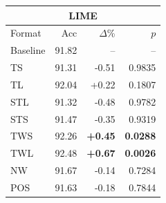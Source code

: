 \begin{tabular}{lrrr}
\toprule
\multicolumn{4}{c}{\textbf{LIME }} \\
\midrule
Format & Acc & $\Delta$\% & $p$ \\
\midrule
Baseline & 91.82 & -- & -- \\
\midrule
TS & 91.31 & -0.51 & 0.9835 \\
TL & 92.04 & +0.22 & 0.1807 \\
STL & 91.32 & -0.48 & 0.9782 \\
STS & 91.47 & -0.35 & 0.9319 \\
TWS & 92.26 & \textbf{+0.45} & \textbf{0.0288} \\
TWL & 92.48 & \textbf{+0.67} & \textbf{0.0026} \\
NW & 91.67 & -0.14 & 0.7284 \\
POS & 91.63 & -0.18 & 0.7844 \\
\bottomrule
\end{tabular}